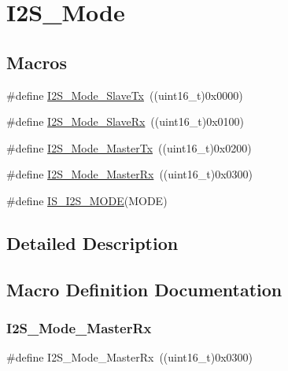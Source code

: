 \hypertarget{group___i2_s___mode}{}\section{I2\+S\+\_\+\+Mode}
\label{group___i2_s___mode}
\subsection*{Macros}
\begin{DoxyCompactItemize}
\item 
\#define \mbox{\hyperlink{group___i2_s___mode_gadd5b20277198fcdb6aa53ea48e802ae5}{I2\+S\+\_\+\+Mode\+\_\+\+Slave\+Tx}}~((uint16\+\_\+t)0x0000)
\item 
\#define \mbox{\hyperlink{group___i2_s___mode_gaaf62ee0353476afc9612dc2933e1c5c5}{I2\+S\+\_\+\+Mode\+\_\+\+Slave\+Rx}}~((uint16\+\_\+t)0x0100)
\item 
\#define \mbox{\hyperlink{group___i2_s___mode_ga3a62ee8964033a3f6fd030da9e40fba6}{I2\+S\+\_\+\+Mode\+\_\+\+Master\+Tx}}~((uint16\+\_\+t)0x0200)
\item 
\#define \mbox{\hyperlink{group___i2_s___mode_gabf9f872cda7c0f159c5fc18aed44e973}{I2\+S\+\_\+\+Mode\+\_\+\+Master\+Rx}}~((uint16\+\_\+t)0x0300)
\item 
\#define \mbox{\hyperlink{group___i2_s___mode_ga942c37b2c1274c4c5773ddcf8b46d9b5}{I\+S\+\_\+\+I2\+S\+\_\+\+M\+O\+DE}}(M\+O\+DE)
\end{DoxyCompactItemize}


\subsection{Detailed Description}


\subsection{Macro Definition Documentation}
\mbox{\label{group___i2_s___mode_gabf9f872cda7c0f159c5fc18aed44e973}} 
\subsubsection{\texorpdfstring{I2S\_Mode\_MasterRx}{I2S\_Mode\_MasterRx}}
{\footnotesize\ttfamily \#define I2\+S\+\_\+\+Mode\+\_\+\+Master\+Rx~((uint16\+\_\+t)0x0300)}

